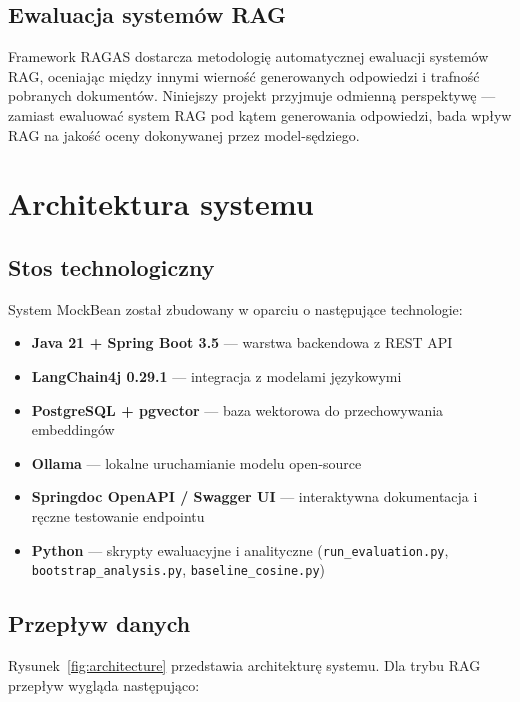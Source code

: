\documentclass[12pt, a4paper]{article}
\begin{document}
\subsection{Ewaluacja systemów RAG}

Framework RAGAS \cite{es2023ragas} dostarcza metodologię automatycznej ewaluacji
systemów RAG, oceniając między innymi wierność generowanych odpowiedzi
i trafność pobranych dokumentów. Niniejszy projekt przyjmuje odmienną perspektywę —
zamiast ewaluować system RAG pod kątem generowania odpowiedzi, bada wpływ RAG
na jakość oceny dokonywanej przez model-sędziego.

\section{Architektura systemu}

\subsection{Stos technologiczny}

System MockBean został zbudowany w oparciu o następujące technologie:

\begin{itemize}
    \item \textbf{Java 21 + Spring Boot 3.5} — warstwa backendowa z REST API
    \item \textbf{LangChain4j 0.29.1} — integracja z modelami językowymi
    \item \textbf{PostgreSQL + pgvector} — baza wektorowa do przechowywania embeddingów
    \item \textbf{Ollama} — lokalne uruchamianie modelu open-source
    \item \textbf{Springdoc OpenAPI / Swagger UI} — interaktywna dokumentacja i ręczne testowanie endpointu
    \item \textbf{Python} — skrypty ewaluacyjne i analityczne (\texttt{run\_evaluation.py}, \texttt{bootstrap\_analysis.py}, \texttt{baseline\_cosine.py})
\end{itemize}

\subsection{Przepływ danych}

Rysunek~\ref{fig:architecture} przedstawia architekturę systemu. Dla trybu RAG
przepływ wygląda następująco:
\end{document}

